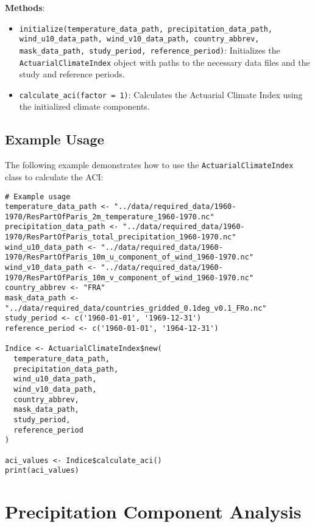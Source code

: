 \documentclass[a4paper,12pt]{article}
\begin{document}
\textbf{Methods}:

\begin{itemize}
    \item \texttt{initialize(temperature\_data\_path, precipitation\_data\_path, wind\_u10\_data\_path, wind\_v10\_data\_path, country\_abbrev, mask\_data\_path, study\_period, reference\_period)}:
        Initializes the \texttt{ActuarialClimateIndex} object with paths to the necessary data files and the study and reference periods.
        
    \item \texttt{calculate\_aci(factor = 1)}:
        Calculates the Actuarial Climate Index using the initialized climate components.
\end{itemize}

\subsection{Example Usage}

The following example demonstrates how to use the \texttt{ActuarialClimateIndex} class to calculate the ACI:

\begin{verbatim}
# Example usage
temperature_data_path <- "../data/required_data/1960-1970/ResPartOfParis_2m_temperature_1960-1970.nc"
precipitation_data_path <- "../data/required_data/1960-1970/ResPartOfParis_total_precipitation_1960-1970.nc"
wind_u10_data_path <- "../data/required_data/1960-1970/ResPartOfParis_10m_u_component_of_wind_1960-1970.nc"
wind_v10_data_path <- "../data/required_data/1960-1970/ResPartOfParis_10m_v_component_of_wind_1960-1970.nc"
country_abbrev <- "FRA"
mask_data_path <- "../data/required_data/countries_gridded_0.1deg_v0.1_FRo.nc"
study_period <- c('1960-01-01', '1969-12-31')
reference_period <- c('1960-01-01', '1964-12-31')

Indice <- ActuarialClimateIndex$new(
  temperature_data_path,
  precipitation_data_path,
  wind_u10_data_path,
  wind_v10_data_path,
  country_abbrev,
  mask_data_path,
  study_period,
  reference_period
)

aci_values <- Indice$calculate_aci()
print(aci_values)
\end{verbatim}

\section{Precipitation Component Analysis}
\label{sec:precipitationcomponent}
\end{document}
